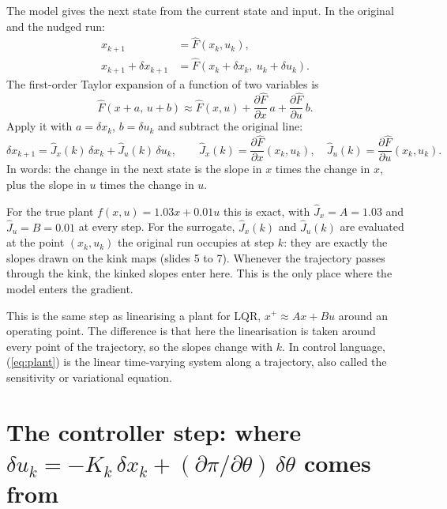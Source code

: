 \documentclass[11pt]{article}
\begin{document}
The model gives the next state from the current state and input. In the original and the nudged run:
\begin{align}
x_{k+1}&=\hat F(x_k,u_k),\\
x_{k+1}+\delta x_{k+1}&=\hat F(x_k+\delta x_k,\ u_k+\delta u_k).
\end{align}
The first-order Taylor expansion of a function of two variables is
\begin{equation}
\hat F(x+a,\,u+b)\approx \hat F(x,u)+\frac{\partial \hat F}{\partial x}\,a+\frac{\partial \hat F}{\partial u}\,b .
\end{equation}
Apply it with $a=\delta x_k$, $b=\delta u_k$ and subtract the original line:
\begin{equation}\label{eq:plant}
\delta x_{k+1}=\hat J_x(k)\,\delta x_k+\hat J_u(k)\,\delta u_k,\qquad
\hat J_x(k)=\frac{\partial \hat F}{\partial x}(x_k,u_k),\quad \hat J_u(k)=\frac{\partial \hat F}{\partial u}(x_k,u_k).
\end{equation}
In words: the change in the next state is the slope in $x$ times the change in $x$, plus the slope in $u$ times the change in $u$.

For the true plant $f(x,u)=1.03x+0.01u$ this is exact, with $\hat J_x=A=1.03$ and $\hat J_u=B=0.01$ at every step. For the surrogate, $\hat J_x(k)$ and $\hat J_u(k)$ are evaluated at the point $(x_k,u_k)$ the original run occupies at step $k$: they are exactly the slopes drawn on the kink maps (slides 5 to 7). Whenever the trajectory passes through the kink, the kinked slopes enter here. This is the only place where the model enters the gradient.

This is the same step as linearising a plant for LQR, $x^+\approx Ax+Bu$ around an operating point. The difference is that here the linearisation is taken around every point of the trajectory, so the slopes change with $k$. In control language, (\ref{eq:plant}) is the linear time-varying system along a trajectory, also called the sensitivity or variational equation.

\section{The controller step: where $\delta u_k=-K_k\,\delta x_k+(\partial\pi/\partial\theta)\,\delta\theta$ comes from}
\end{document}
